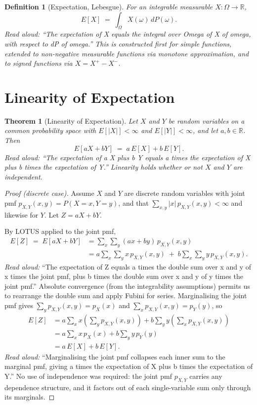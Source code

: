 \documentclass[11pt]{article}
\newtheorem{theorem}{Theorem}
\newtheorem{definition}{Definition}
\begin{document}
\begin{definition}[Expectation, Lebesgue]
For an integrable measurable $X : \Omega \to \mathbb{R}$,
\[
E[X] \;=\; \int_{\Omega} X(\omega)\, dP(\omega).
\]
\emph{Read aloud:} ``The expectation of X equals the integral over Omega of X of omega, with respect to dP of omega.''
This is constructed first for simple functions, extended to non-negative
measurable functions via monotone approximation, and to signed functions
via $X = X^+ - X^-$.
\end{definition}

\section{Linearity of Expectation}

\begin{theorem}[Linearity of Expectation]
\label{thm:linearity}
Let $X$ and $Y$ be random variables on a common probability space with
$E[|X|] < \infty$ and $E[|Y|] < \infty$, and let $a, b \in \mathbb{R}$. Then
\[
E[aX + bY] \;=\; a\,E[X] + b\,E[Y].
\]
\emph{Read aloud:} ``The expectation of a X plus b Y equals a times the expectation of X plus b times the expectation of Y.''
Linearity holds whether or not $X$ and $Y$ are independent.
\end{theorem}

\begin{proof}[Proof (discrete case)]
Assume $X$ and $Y$ are discrete random variables with joint pmf
$p_{X,Y}(x, y) = P(X = x, Y = y)$, and that
$\sum_{x,y} |x|\, p_{X,Y}(x,y) < \infty$ and likewise for $Y$. Let
$Z = aX + bY$.

By LOTUS applied to the joint pmf,
\begin{align*}
E[Z] \;=\; E[aX + bY]
     &= \sum_{x} \sum_{y} (a x + b y)\, p_{X,Y}(x, y) \\
     &= a \sum_{x} \sum_{y} x\, p_{X,Y}(x, y)
        \;+\; b \sum_{x} \sum_{y} y\, p_{X,Y}(x, y).
\end{align*}
\emph{Read aloud:} ``The expectation of Z equals a times the double sum over x and y of x times the joint pmf, plus b times the double sum over x and y of y times the joint pmf.''
Absolute convergence (from the integrability assumptions) permits us to
rearrange the double sum and apply Fubini for series. Marginalising the
joint pmf gives $\sum_{y} p_{X,Y}(x, y) = p_X(x)$ and
$\sum_{x} p_{X,Y}(x, y) = p_Y(y)$, so
\begin{align*}
E[Z] &= a \sum_{x} x \left( \sum_{y} p_{X,Y}(x, y) \right)
       + b \sum_{y} y \left( \sum_{x} p_{X,Y}(x, y) \right) \\
     &= a \sum_{x} x\, p_X(x) + b \sum_{y} y\, p_Y(y) \\
     &= a\, E[X] + b\, E[Y].
\end{align*}
\emph{Read aloud:} ``Marginalising the joint pmf collapses each inner sum to the marginal pmf, giving a times the expectation of X plus b times the expectation of Y.''
No use of independence was required: the joint pmf $p_{X,Y}$ carries any
dependence structure, and it factors out of each single-variable sum only
through its marginals.
\end{proof}
\end{document}
